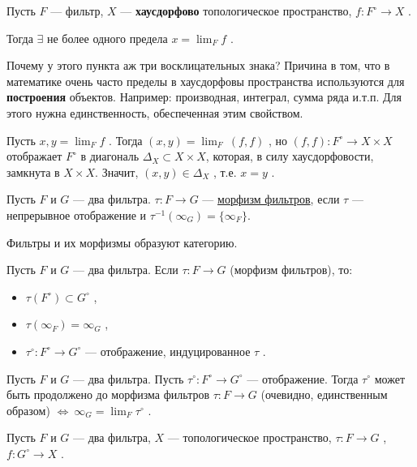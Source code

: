 \SSsect[!!!] Пусть \( F \) --- фильтр, \( X \) --- \textbf{хаусдорфово} топологическое пространство, \( f: F^\circ \rightarrow X \) .

Тогда \( \exists \) не более одного предела \( \displaystyle x = \lim_{F} f \) .

Почему у этого пункта аж три восклицательных знака? 
Причина в том, что в математике очень часто пределы в хаусдорфовы пространства используются для \textbf{построения} объектов. 
Например: производная, интеграл, сумма ряда и.т.п. 
Для этого нужна единственность, обеспеченная этим свойством.

\SSproof

Пусть \( \displaystyle x,y = \lim_{F} f \) . 
Тогда \( \displaystyle (x,y) = \lim_{F}~(f,f) \) , но \( (f,f) : F^\circ \rightarrow X \times X \) отображает \( F^\circ \) в диагональ \( \Delta_X \subset X \times X \), которая, в силу хаусдорфовости, замкнута в \( X \times X \). 
Значит, \( (x,y) \in \Delta_X \) , т.е. \( x=y \) .

\SSendp

\pagebreak

\SSbullet 

\SSsect[def] Пусть \( F \) и \( G \) --- два фильтра. 
\( \tau : F \rightarrow G \) --- \underline{морфизм фильтров}, если \( \tau \) --- непрерывное отображение и \( \tau^{-1}(\infty_G)=\{\infty_F\} \).

Фильтры и их морфизмы образуют категорию.

\SSsect Пусть \( F \) и \( G \) --- два фильтра. Если \( \tau : F \rightarrow G \) (морфизм фильтров), то:
\begin{itemize}[label=]
\item \( \tau(F^\circ) \subset G^\circ \) ,
\item \( \tau(\infty_F)=\infty_G \) , 
\item \( \tau^\circ: F^\circ \rightarrow G^\circ \) --- отображение, индуцированное \( \tau \) .
\end{itemize}

\SSsect Пусть \( F \) и \( G \) --- два фильтра.
Пусть \( \tau^\circ: F^\circ \rightarrow G^\circ \) --- отображение. 
Тогда \(  \tau^\circ \) может быть продолжено до морфизма фильтров \( \tau : F \rightarrow G \) (очевидно, единственным образом) \( \Leftrightarrow~ \displaystyle \infty_G = \lim_{F} \tau^\circ \) .

\SSsect Пусть \( F \) и \( G \) --- два фильтра, \( X \) --- топологическое пространство, \( \tau : F \rightarrow G \) , \( f:G^\circ \rightarrow X \) .

